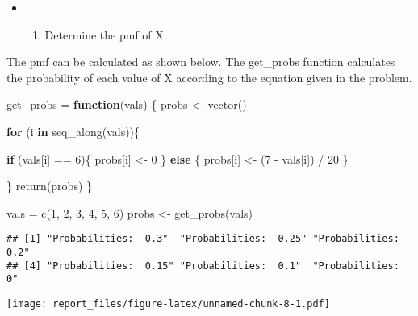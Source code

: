 \documentclass[
]{article}
\newenvironment{Shaded}{\begin{snugshade}}{\end{snugshade}}
\newcommand{\ControlFlowTok}[1]{\textcolor[rgb]{0.13,0.29,0.53}{\textbf{#1}}}
\newcommand{\DecValTok}[1]{\textcolor[rgb]{0.00,0.00,0.81}{#1}}
\newcommand{\FunctionTok}[1]{\textcolor[rgb]{0.00,0.00,0.00}{#1}}
\newcommand{\NormalTok}[1]{#1}
\newcommand{\OtherTok}[1]{\textcolor[rgb]{0.56,0.35,0.01}{#1}}
\newcommand{\SpecialCharTok}[1]{\textcolor[rgb]{0.00,0.00,0.00}{#1}}
\providecommand{\tightlist}{%
  \setlength{\itemsep}{0pt}\setlength{\parskip}{0pt}}
\begin{document}
\begin{itemize}
\item
  \begin{enumerate}
  \def\labelenumi{\alph{enumi})}
  \tightlist
  \item
    Determine the pmf of X.
  \end{enumerate}
\end{itemize}

\begin{center}
    The pmf can be calculated as shown below. The get_probs function calculates
    the probability of each value of X according to the equation given in the
    problem.
\end{center}

\begin{Shaded}
\begin{Highlighting}[]
\NormalTok{get\_probs }\OtherTok{=} \ControlFlowTok{function}\NormalTok{(vals) \{}
\NormalTok{  probs }\OtherTok{\textless{}{-}} \FunctionTok{vector}\NormalTok{()}
  
  \ControlFlowTok{for}\NormalTok{ (i }\ControlFlowTok{in} \FunctionTok{seq\_along}\NormalTok{(vals))\{}
    
    \ControlFlowTok{if}\NormalTok{ (vals[i] }\SpecialCharTok{==} \DecValTok{6}\NormalTok{)\{}
\NormalTok{      probs[i] }\OtherTok{\textless{}{-}} \DecValTok{0}
\NormalTok{    \} }\ControlFlowTok{else}\NormalTok{ \{}
\NormalTok{      probs[i] }\OtherTok{\textless{}{-}}\NormalTok{ (}\DecValTok{7} \SpecialCharTok{{-}}\NormalTok{ vals[i]) }\SpecialCharTok{/} \DecValTok{20}
\NormalTok{    \}}
    
\NormalTok{  \}}
  \FunctionTok{return}\NormalTok{(probs)}
\NormalTok{\}}

\NormalTok{vals }\OtherTok{=} \FunctionTok{c}\NormalTok{(}\DecValTok{1}\NormalTok{, }\DecValTok{2}\NormalTok{, }\DecValTok{3}\NormalTok{, }\DecValTok{4}\NormalTok{, }\DecValTok{5}\NormalTok{, }\DecValTok{6}\NormalTok{)}
\NormalTok{probs }\OtherTok{\textless{}{-}} \FunctionTok{get\_probs}\NormalTok{(vals)}
\end{Highlighting}
\end{Shaded}

\begin{verbatim}
## [1] "Probabilities:  0.3"  "Probabilities:  0.25" "Probabilities:  0.2" 
## [4] "Probabilities:  0.15" "Probabilities:  0.1"  "Probabilities:  0"
\end{verbatim}

\texttt{[image: report\_files/figure-latex/unnamed-chunk-8-1.pdf]}
\end{document}
